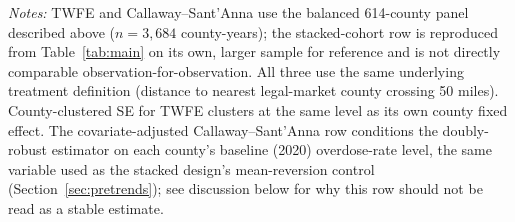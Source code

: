 \documentclass[preprint,12pt,authoryear]{elsarticle}
\begin{document}
\begin{table}[htbp]
\centering
\caption{Estimator comparison: TWFE and Callaway--Sant'Anna vs. the stacked-cohort design}
\label{tab:twfecs}
\vspace{2pt}
\begin{minipage}{0.95\textwidth}
\footnotesize\emph{Notes:} TWFE and Callaway--Sant'Anna use the
balanced 614-county panel described above ($n=3{,}684$ county-years);
the stacked-cohort row is reproduced from Table~\ref{tab:main} on its
own, larger sample for reference and is not directly comparable
observation-for-observation. All three use the same underlying
treatment definition (distance to nearest legal-market county crossing
50 miles). County-clustered SE for TWFE clusters at the same level as
its own county fixed effect. The covariate-adjusted Callaway--Sant'Anna
row conditions the doubly-robust estimator on each county's baseline
(2020) overdose-rate level, the same variable used as the stacked
design's mean-reversion control (Section~\ref{sec:pretrends}); see
discussion below for why this row should not be read as a stable
estimate.
\end{minipage}
\end{table}
\end{document}
